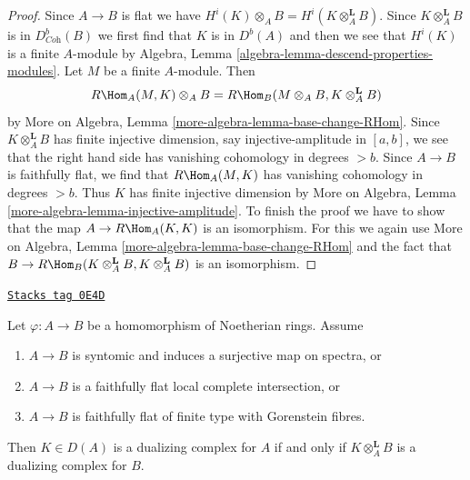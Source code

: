 \begin{proof}
Since $A \to B$ is flat we have
$H^i(K) \otimes_A B = H^i(K \otimes_A^\mathbf{L} B)$.
Since $K \otimes_A^\mathbf{L} B$ is in $D^b_{\textit{Coh}}(B)$
we first find that $K$ is in $D^b(A)$ and then we see that
$H^i(K)$ is a finite $A$-module by
Algebra, Lemma \ref{algebra-lemma-descend-properties-modules}.
Let $M$ be a finite $A$-module. Then
$$
R\Hom_A(M, K) \otimes_A B = R\Hom_B(M \otimes_A B, K \otimes_A^\mathbf{L} B)
$$
by More on Algebra, Lemma \ref{more-algebra-lemma-base-change-RHom}.
Since $K \otimes_A^\mathbf{L} B$ has finite injective dimension,
say injective-amplitude in $[a, b]$, we see that the right hand side
has vanishing cohomology in degrees $> b$.
Since $A \to B$ is faithfully flat, we find
that $R\Hom_A(M, K)$ has vanishing cohomology in degrees $> b$.
Thus $K$ has finite injective dimension by
More on Algebra, Lemma \ref{more-algebra-lemma-injective-amplitude}.
To finish the proof we have to show that the map
$A \to R\Hom_A(K, K)$ is an isomorphism.
For this we again use
More on Algebra, Lemma \ref{more-algebra-lemma-base-change-RHom}
and the fact that
$B \to R\Hom_B(K \otimes_A^\mathbf{L} B, K \otimes_A^\mathbf{L} B)$
is an isomorphism.
\end{proof}

\begin{lemma}
\label{dualizing-lemma-descent-ascent}
\href{https://stacks.math.columbia.edu/tag/0E4D}{\texttt{Stacks tag 0E4D}}

Let $\varphi : A \to B$ be a homomorphism of Noetherian rings. Assume
\begin{enumerate}
\item $A \to B$ is syntomic and induces a surjective map on spectra, or
\item $A \to B$ is a faithfully flat local complete intersection, or
\item $A \to B$ is faithfully flat of finite type with Gorenstein fibres.
\end{enumerate}
Then $K \in D(A)$ is a dualizing complex for $A$ if and only if
$K \otimes_A^\mathbf{L} B$ is a dualizing complex for $B$.
\end{lemma}

